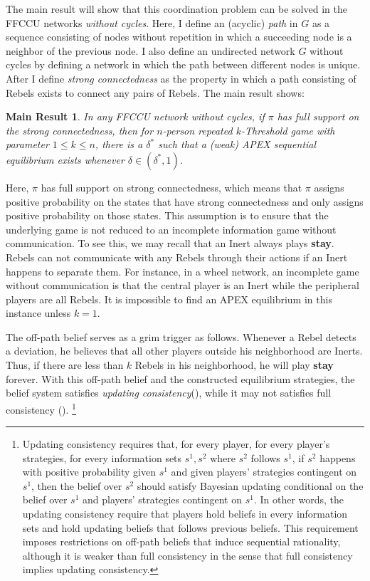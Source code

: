 \documentclass[12pt,letterpaper]{article}
\newtheorem*{main result}{Main Result}
\theoremstyle{definition}
\theoremstyle{remark}
\theoremstyle{claim}
\begin{document}
The main result will show that this coordination problem can be solved in the FFCCU networks \textit{without cycles}. Here, I define an (acyclic) \textit{path} in $G$ as a sequence consisting of nodes without repetition in which a succeeding node is a neighbor of the previous node. I also define an undirected network $G$ without cycles by defining a network in which the path between different nodes is unique. After I define \textit{strong connectedness} as the property in which a path consisting of Rebels exists to connect any pairs of Rebels. The main result shows:



\begin{main result}
In any FFCCU network without cycles, if $\pi$ has full support on the strong connectedness, then for $n$-person repeated $k$-Threshold game with parameter $1\leq k \leq n$, there is a $\delta^{*}$ such that a (weak) APEX sequential equilibrium exists whenever $\delta\in (\delta^{*},1)$.  
\end{main result}

Here, $\pi$ has full support on strong connectedness, which means that $\pi$ assigns positive probability on the states that have strong connectedness and only assigns positive probability on those states. This assumption is to ensure that the underlying game is not reduced to an incomplete information game without communication. To see this, we may recall that an Inert always plays \textbf{stay}. Rebels can not communicate with any Rebels through their actions if an Inert happens to separate them. For instance, in a wheel network, an incomplete game without communication is that the central player is an Inert while the peripheral players are all Rebels. It is impossible to find an APEX equilibrium in this instance unless $k=1$.



The off-path belief serves as a grim trigger as follows. Whenever a Rebel detects a deviation, he believes that all other players outside his neighborhood are Inerts. Thus, if there are less than $k$ Rebels in his neighborhood, he will play \textbf{stay} forever. With this off-path belief and the constructed equilibrium strategies, the belief system satisfies \textit{updating consistency}(\citep{Perea2002}), while it may not satisfies full consistency (\citep{Krep_Wilson1982}). \footnote{ Updating consistency requires that, for every player, for every player's strategies, for every information sets $s^1,s^2$ where $s^2$ follows $s^1$, if $s^2$ happens with positive probability given $s^1$ and given players' strategies contingent on $s^1$, then the belief over $s^2$ should satisfy Bayesian updating conditional on the belief over $s^1$ and players' strategies contingent on $s^1$. In other words, the updating consistency require that players hold beliefs in every information sets and hold updating beliefs that follows previous beliefs. This requirement imposes restrictions on off-path beliefs that induce sequential rationality, although it is weaker than full consistency in the sense that full consistency implies updating consistency.}
\end{document}
